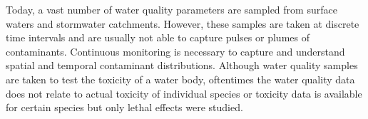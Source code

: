 Today, a vast number of water quality parameters are sampled from
surface waters and stormwater catchments. However, these samples are
taken at discrete time intervals and are usually not able to capture
pulses or plumes of contaminants. Continuous monitoring is necessary to
capture and understand spatial and temporal contaminant distributions.
Although water quality samples are taken to test the toxicity of a water
body, oftentimes the water quality data does not relate to actual
toxicity of individual species or toxicity data is available for certain
species but only lethal effects were studied.